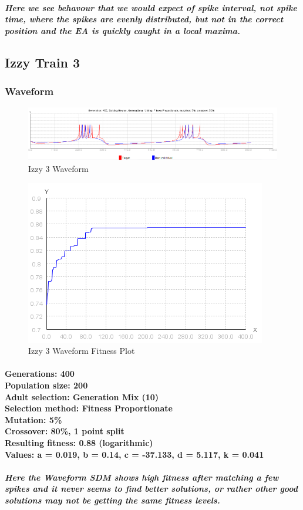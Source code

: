 \documentclass[titlepage,norsk]{article}
\begin{document}
\subparagraph{Here we see behavour that we would expect of spike interval, not spike time, where the spikes are evenly distributed, but not in the correct position and the EA is quickly caught in a local maxima.}


\subsection{Izzy Train 3}

\subsubsection{Waveform}

\begin{figure}[h!]
\centering
\includegraphics[scale=0.75]{izzy3wave.png}
\caption{Izzy 3 Waveform}
\label{fig:awesome_image}
\end{figure}

\begin{figure}[h!]
\centering
\includegraphics[scale=0.75]{izzy3waveFitness.png}
\caption{Izzy 3 Waveform Fitness Plot}
\label{fig:awesome_image}
\end{figure}

\paragraph{
Generations: 400\\
Population size: 200\\
Adult selection: Generation Mix (10) \\
Selection method: Fitness Proportionate \\
Mutation: 5\% \\
Crossover: 80\%, 1 point split \\
Resulting fitness: 0.88 (logarithmic) \\
Values: a = 0.019, b = 0.14, c = -37.133, d = 5.117, k = 0.041 \\
}
\subparagraph{Here the Waveform SDM shows high fitness after matching a few spikes and  it never seems to find better solutions, or rather other good solutions may not be getting the same fitness levels.}
\end{document}

